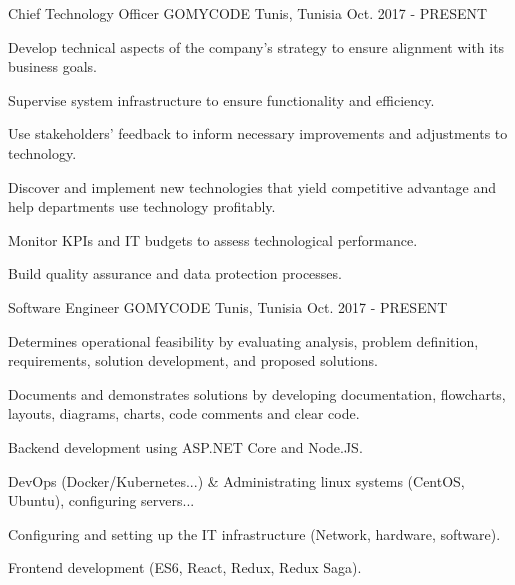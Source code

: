 

\begin{cventries}

  \cventry
    {Chief Technology Officer} %
    {GOMYCODE} %
    {Tunis, Tunisia} %
    {Oct. 2017 - PRESENT} %
    {
      \begin{cvitems} %
        \item {Develop technical aspects of the company’s strategy to ensure alignment with its business goals.}
        \item {Supervise system infrastructure to ensure functionality and efficiency.}
        \item {Use stakeholders’ feedback to inform necessary improvements and adjustments to technology.}
        \item {Discover and implement new technologies that yield competitive advantage and help departments use technology profitably.}
        \item {Monitor KPIs and IT budgets to assess technological performance.}
        \item {Build quality assurance and data protection processes.}
      \end{cvitems}
    }

  \cventry
    {Software Engineer} %
    {GOMYCODE} %
    {Tunis, Tunisia} %
    {Oct. 2017 - PRESENT} %
    {
      \begin{cvitems} %
\item {Determines operational feasibility by evaluating analysis, problem definition, requirements, solution development, and proposed solutions.}
\item {Documents and demonstrates solutions by developing documentation, flowcharts, layouts, diagrams, charts, code comments and clear code.}
\item {Backend development using ASP.NET Core and Node.JS.}
\item {DevOps (Docker/Kubernetes...) \& Administrating linux systems (CentOS, Ubuntu), configuring servers...}
\item {Configuring and setting up the IT infrastructure (Network, hardware, software).}
\item {Frontend development (ES6, React, Redux, Redux Saga).}
      \end{cvitems}
    }


\end{cventries}
